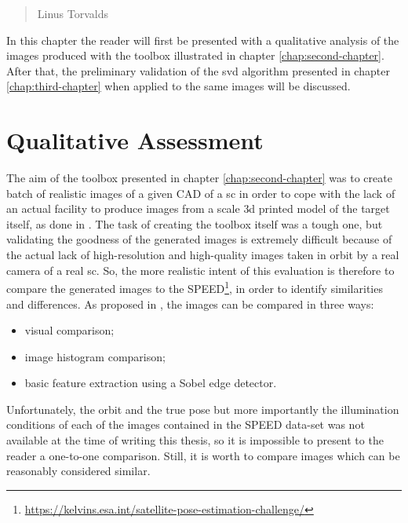 \begin{quotation}
  {\footnotesize
    \begin{flushright}
      Linus Torvalds
    \end{flushright}
  }
\end{quotation}
\vspace{0.5cm}

In this chapter the reader will first be presented with a qualitative analysis of the images produced with the toolbox illustrated in chapter \ref{chap:second-chapter}. After that, the preliminary validation of the \acrshort{svd} algorithm presented in chapter \ref{chap:third-chapter}  when applied to the same images will be discussed.

\section{Qualitative Assessment}
The aim of the toolbox presented in chapter \ref{chap:second-chapter} was to create batch of realistic images of a given CAD of a \acrshort{sc} in order to cope with the lack of an actual facility to produce images from a scale \acrshort{3d} printed model of the target itself, as done in \cite{Beierle2019}. The task of creating the toolbox itself was a tough one, but validating the goodness of the generated images is extremely difficult because of the actual lack of high-resolution and high-quality images taken in orbit by a real camera of a real \acrshort{sc}. So, the more realistic intent of this evaluation is therefore to compare the generated images to the SPEED\footnote{\url{https://kelvins.esa.int/satellite-pose-estimation-challenge/}}, in order to identify similarities and differences. As proposed in \cite{pangufinal}, the images can be compared in three ways:

\begin{itemize}
  \item visual comparison;
  \item image histogram comparison;
  \item basic feature extraction using a Sobel edge detector.
\end{itemize}

Unfortunately, the orbit and the true pose but more importantly the illumination conditions of each of the images contained in the SPEED data-set was not available at the time of writing this thesis, so it is impossible to present to the reader a one-to-one comparison. Still, it is worth to compare images which can be reasonably considered similar.

